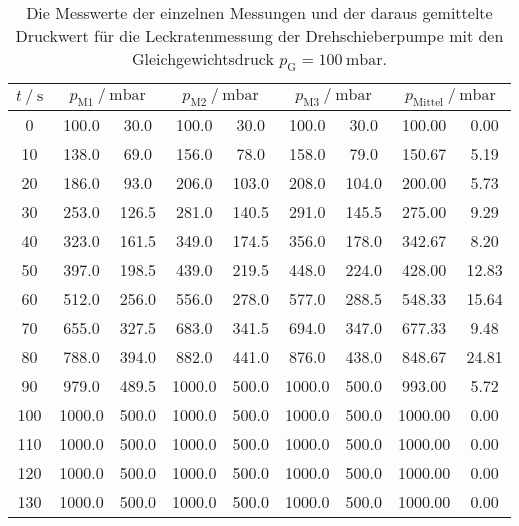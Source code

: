   \begin{table}[h]
    \centering
    \caption{Die Messwerte der einzelnen Messungen und der daraus gemittelte Druckwert für die Leckratenmessung der Drehschieberpumpe mit den 
    Gleichgewichtsdruck $p_\text{G} = \SI{100}{\milli\bar}$.}
    \label{tab:dreh_leck_100}
    \begin{tabular}{S[table-format=3.0] S @{${}\pm{}$} S[table-format=3.2] S @{${}\pm{}$} S[table-format=3.2] S @{${}\pm{}$} S[table-format=3.2] S[table-format=4.2] @{${}\pm{}$} S[table-format=2.2]}
    \toprule
    {$t \mathbin{/} \si{\second} $} &  &  &  &  \\
     &  100.0 &  30.0 &  100.0 &  30.0 &  100.0 &  30.0 &  100.00 &  0.00 \\  
     10 &  138.0 &  69.0 &  156.0 &  78.0 &  158.0 &  79.0 &  150.67 &  5.19 \\
     20 &  186.0 &  93.0 &  206.0 & 103.0 &  208.0 & 104.0 &  200.00 &  5.73 \\
     30 &  253.0 & 126.5 &  281.0 & 140.5 &  291.0 & 145.5 &  275.00 &  9.29 \\
     40 &  323.0 & 161.5 &  349.0 & 174.5 &  356.0 & 178.0 &  342.67 &  8.20 \\
     50 &  397.0 & 198.5 &  439.0 & 219.5 &  448.0 & 224.0 &  428.00 & 12.83 \\
     60 &  512.0 & 256.0 &  556.0 & 278.0 &  577.0 & 288.5 &  548.33 & 15.64 \\
     70 &  655.0 & 327.5 &  683.0 & 341.5 &  694.0 & 347.0 &  677.33 &  9.48 \\
     80 &  788.0 & 394.0 &  882.0 & 441.0 &  876.0 & 438.0 &  848.67 & 24.81 \\
     90 &  979.0 & 489.5 & 1000.0 & 500.0 & 1000.0 & 500.0 &  993.00 &  5.72 \\
    100 & 1000.0 & 500.0 & 1000.0 & 500.0 & 1000.0 & 500.0 & 1000.00 &  0.00 \\
    110 & 1000.0 & 500.0 & 1000.0 & 500.0 & 1000.0 & 500.0 & 1000.00 &  0.00 \\
    120 & 1000.0 & 500.0 & 1000.0 & 500.0 & 1000.0 & 500.0 & 1000.00 &  0.00 \\
    130 & 1000.0 & 500.0 & 1000.0 & 500.0 & 1000.0 & 500.0 & 1000.00 &  0.00 \\

\end{tabular}
\end{table}
